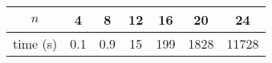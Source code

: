 \begin{center}
\begin{tabular}{c | c c c c c c}
$n$ & 4 & 8 & 12 & 16 & 20 & 24 \\ \hline
time (s) & 0.1 & 0.9 & 15 & 199 & 1828 & 11728 \\
\end{tabular}
\end{center}